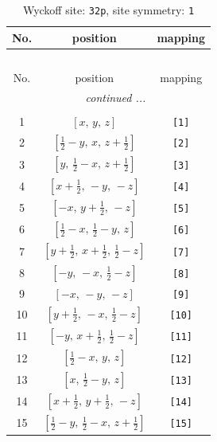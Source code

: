 \documentclass[fleqn,8pt]{jsarticle}
\begin{document}
\renewcommand{\arraystretch}{1.2}
\begin{longtable}{ccc}
\caption{Wyckoff site: {\tt 32p}, site symmetry: {\tt 1}}
 \\
 \hline \hline
No. & position & mapping \\ \hline \endfirsthead

\multicolumn{2}{l}{\tablename\ \thetable{}} \\
 \hline \hline
No. & position & mapping \\ \hline \endhead

 \hline \hline
\multicolumn{2}{r}{\footnotesize\it continued ...} \\ \endfoot

 \hline \hline
\multicolumn{2}{r}{} \\ \endlastfoot

1 & $\left[ x,\, y,\, z \right]$ & {\tt [1]} \\ \hline
2 & $\left[ \frac{1}{2} - y,\, x,\, z + \frac{1}{2} \right]$ & {\tt [2]} \\ \hline
3 & $\left[ y,\, \frac{1}{2} - x,\, z + \frac{1}{2} \right]$ & {\tt [3]} \\ \hline
4 & $\left[ x + \frac{1}{2},\, - y,\, - z \right]$ & {\tt [4]} \\ \hline
5 & $\left[ - x,\, y + \frac{1}{2},\, - z \right]$ & {\tt [5]} \\ \hline
6 & $\left[ \frac{1}{2} - x,\, \frac{1}{2} - y,\, z \right]$ & {\tt [6]} \\ \hline
7 & $\left[ y + \frac{1}{2},\, x + \frac{1}{2},\, \frac{1}{2} - z \right]$ & {\tt [7]} \\ \hline
8 & $\left[ - y,\, - x,\, \frac{1}{2} - z \right]$ & {\tt [8]} \\ \hline
9 & $\left[ - x,\, - y,\, - z \right]$ & {\tt [9]} \\ \hline
10 & $\left[ y + \frac{1}{2},\, - x,\, \frac{1}{2} - z \right]$ & {\tt [10]} \\ \hline
11 & $\left[ - y,\, x + \frac{1}{2},\, \frac{1}{2} - z \right]$ & {\tt [11]} \\ \hline
12 & $\left[ \frac{1}{2} - x,\, y,\, z \right]$ & {\tt [12]} \\ \hline
13 & $\left[ x,\, \frac{1}{2} - y,\, z \right]$ & {\tt [13]} \\ \hline
14 & $\left[ x + \frac{1}{2},\, y + \frac{1}{2},\, - z \right]$ & {\tt [14]} \\ \hline
15 & $\left[ \frac{1}{2} - y,\, \frac{1}{2} - x,\, z + \frac{1}{2} \right]$ & {\tt [15]} \\ \hline

\end{longtable}
\end{document}
